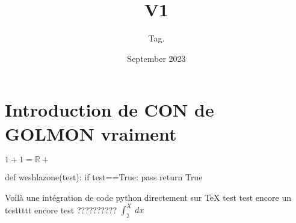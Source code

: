 \documentclass{article}
\title{V1}
\author{Tag. }
\date{September 2023}
\begin{document}
\maketitle

\section{Introduction de CON de GOLMON  vraiment}
$1+1=\mathbb{R+}$
\begin{python}
def weshlazone(test):
    if test==True:
        pass
    return True
\end{python}
Voilà une intégration de code python directement sur TeX
test test encore un testtttt encore test ??????????
$\int_{\gimel }^{X } \,dx$ 
    
\end{document}
